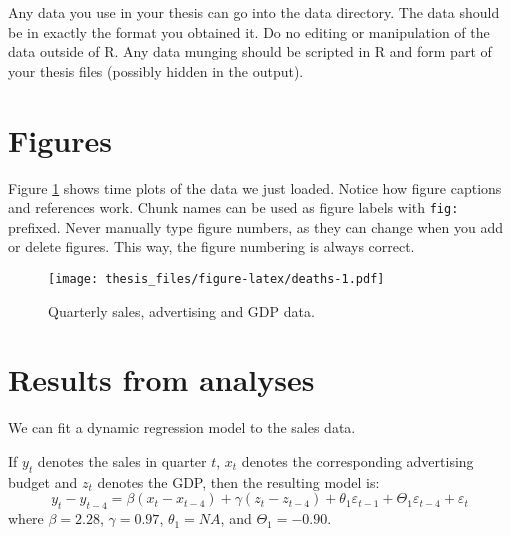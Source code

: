 \documentclass{aucklandthesis}
\begin{document}
\begin{Shaded}
\begin{Highlighting}[]
\StringTok{ }\NormalTok{(}\NormalTok{(}\NormalTok{)[, }\NormalTok{], } \NormalTok{, } \NormalTok{)}
\end{Highlighting}
\end{Shaded}

Any data you use in your thesis can go into the data directory. The data should be in exactly the format you obtained it. Do no editing or manipulation of the data outside of R. Any data munging should be scripted in R and form part of your thesis files (possibly hidden in the output).

\hypertarget{figures}{%
\section{Figures}\label{figures}}

Figure \ref{fig:deaths} shows time plots of the data we just loaded. Notice how figure captions and references work. Chunk names can be used as figure labels with \texttt{fig:} prefixed. Never manually type figure numbers, as they can change when you add or delete figures. This way, the figure numbering is always correct.

\begin{figure}
\centering
\texttt{[image: thesis\_files/figure-latex/deaths-1.pdf]}
\caption{\label{fig:deaths}Quarterly sales, advertising and GDP data.}
\end{figure}

\hypertarget{results-from-analyses}{%
\section{Results from analyses}\label{results-from-analyses}}

We can fit a dynamic regression model to the sales data.

If \(y_t\) denotes the sales in quarter \(t\), \(x_t\) denotes the corresponding advertising budget and \(z_t\) denotes the GDP, then the resulting model is:
\begin{equation}
  y_t - y_{t-4} = \beta (x_t-x_{t-4}) + \gamma (z_t-z_{t-4}) + \theta_1 \varepsilon_{t-1} + \Theta_1 \varepsilon_{t-4} + \varepsilon_t
\end{equation}
where
\(\beta = 2.28\),
\(\gamma = 0.97\),
\(\theta_1 = NA\),
and
\(\Theta_1 = -0.90\).
\end{document}
